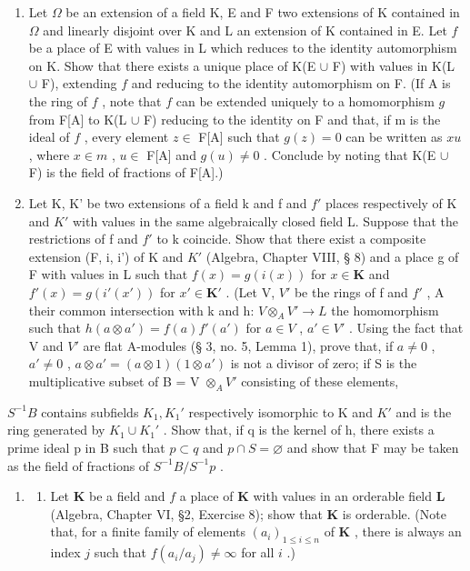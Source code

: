 
\begin{enumerate}
\def\labelenumi{\arabic{enumi}.}
\item
  Let \(\Omega\) be an extension of a field K, E and F two extensions of K contained in \(\Omega\) and linearly disjoint over K and L an extension of K contained in E. Let \(f\) be a place of E with values in L which reduces to the identity automorphism on K. Show that there exists a unique place of K(E \(\cup\) F) with values in K(L \(\cup\) F), extending \(f\) and reducing to the identity automorphism on F. (If A is the ring of \(f\) , note that \(f\) can be extended uniquely to a homomorphism \(g\) from F{[}A{]} to K(L \(\cup\) F) reducing to the identity on F and that, if m is the ideal of \(f\) , every element \(z \in\) F{[}A{]} such that \(g(z) = 0\) can be written as \(xu\) , where \(x \in m\) , \(u \in\) F{[}A{]} and \(g(u) \neq 0\) . Conclude by noting that K(E \(\cup\) F) is the field of fractions of F{[}A{]}.)
\item
  Let K, K' be two extensions of a field k and f and \(f'\) places respectively of K and \(K'\) with values in the same algebraically closed field L. Suppose that the restrictions of f and \(f'\) to k coincide. Show that there exist a composite extension (F, i, i') of K and \(K'\) (Algebra, Chapter VIII, § 8) and a place g of F with values in L such that \(f(x) = g(i(x))\) for \(x \in \mathbf{K}\) and \(f'(x) = g(i'(x'))\) for \(x' \in \mathbf{K}'\) . (Let V, \(V'\) be the rings of f and \(f'\) , A their common intersection with k and h: \(V \otimes_{A} V' \to L\) the homomorphism such that \(h(a \otimes a') = f(a)f'(a')\) for \(a \in V\) , \(a' \in V'\) . Using the fact that V and \(V'\) are flat A-modules (§ 3, no. 5, Lemma 1), prove that, if \(a \neq 0\) , \(a' \neq 0\) , \(a \otimes a' = (a \otimes 1)(1 \otimes a')\) is not a divisor of zero; if S is the multiplicative subset of B = V \(\otimes_{A} V'\) consisting of these elements,
\end{enumerate}

\(S^{-1}B\) contains subfields \(K_{1}, K_{1}'\) respectively isomorphic to K and \(K'\) and is the ring generated by \(K_{1} \cup K_{1}'\) . Show that, if q is the kernel of h, there exists a prime ideal p in B such that \(p \subset q\) and \(p \cap S = \varnothing\) and show that F may be taken as the field of fractions of \(S^{-1}B/S^{-1}p\) .

\begin{enumerate}
\def\labelenumi{\arabic{enumi}.}
\setcounter{enumi}{2}
\tightlist
\item
  \begin{enumerate}
  \def\labelenumii{(\alph{enumii})}
  \tightlist
  \item
    Let \(\mathbf{K}\) be a field and \(f\) a place of \(\mathbf{K}\) with values in an orderable field \(\mathbf{L}\) (Algebra, Chapter VI, §2, Exercise 8); show that \(\mathbf{K}\) is orderable. (Note that, for a finite family of elements \((a_i)_{1\leq i\leq n}\) of \(\mathbf{K}\) , there is always an index \(j\) such that \(f(a_i / a_j)\neq \infty\) for all \(i\) .)
  \end{enumerate}
\end{enumerate}

